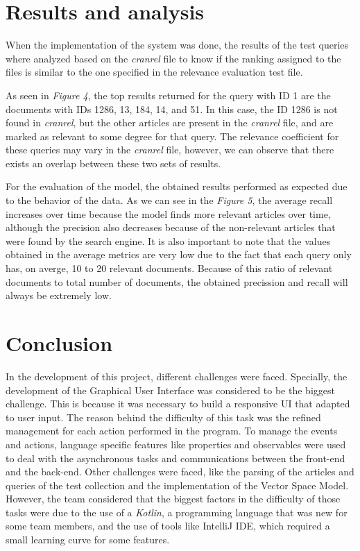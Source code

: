 \documentclass{article}
\begin{document}
\section{Results and analysis}
When the implementation of the system was done, the results of the test queries where analyzed based on the \textit{cranrel} file to know if the ranking assigned to the files is similar to the one specified in the relevance evaluation test file.

As seen in \textit{Figure 4}, the top results returned for the query with ID 1 are the documents with IDs 1286, 13, 184, 14, and 51. In this case, the ID 1286 is not found in \textit{cranrel}, but the other articles are present in the \textit{cranrel} file, and are marked as relevant to some degree for that query. The relevance coefficient for these queries may vary in the \textit{cranrel} file, however, we can observe that there exists an overlap between these two sets of results.

For the evaluation of the model, the obtained results performed as expected due to the behavior of the data. As we can see in the \textit{Figure 5}, the average recall increases over time because the model finds more relevant articles over time, although the precision also decreases because of the non-relevant articles that were found by the search engine.
It is also important to note that the values obtained in the average metrics are very low due to the fact that each query only has, on averge, 10 to 20 relevant documents. Because of this ratio of relevant documents to total number of documents, the obtained precission and recall will always be extremely low.


\section{Conclusion}
In the development of this project, different challenges were faced. Specially, the development of the Graphical User Interface was considered to be the biggest challenge. This is because it was necessary to build a responsive UI that adapted to user input. The reason behind the difficulty of this task was the refined management for each action performed in the program. To manage the events and actions, language specific features like properties and observables were used to deal with the asynchronous tasks and communications between the front-end and the back-end.
Other challenges were faced, like the parsing of the articles and queries of the test collection and the implementation of the Vector Space Model. However, the team considered that the biggest factors in the difficulty of those tasks were due to the use of a \textit{Kotlin}, a programming language that was new for some team members, and the use of tools like IntelliJ IDE, which required a small learning curve for some features.
\end{document}
